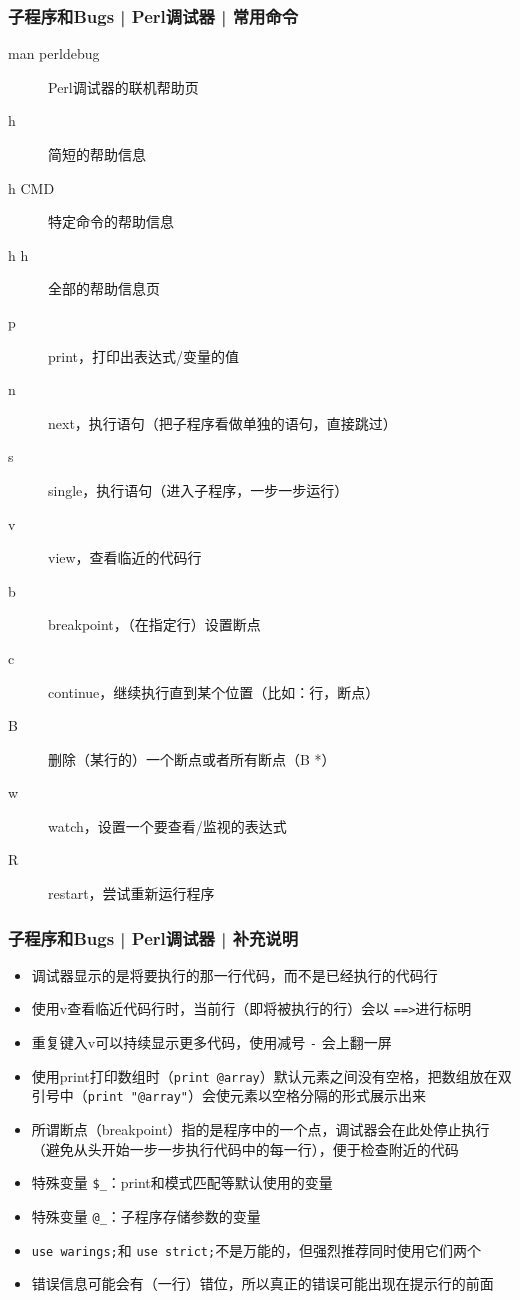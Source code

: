 \begin{frame}
  \frametitle{子程序和Bugs | Perl调试器 | \alert{常用命令}}
  \begin{description}
    \item[man perldebug] Perl调试器的联机帮助页
    \item[h] 简短的帮助信息
    \item[h CMD] 特定命令的帮助信息
    \item[h h] 全部的帮助信息页
    \item[p] print，打印出表达式/变量的值
    \item[n] next，执行语句（把子程序看做单独的语句，直接跳过）
    \item[s] single，执行语句（进入子程序，一步一步运行）
    \item[v] view，查看临近的代码行
    \item[b] breakpoint，（在指定行）设置断点
    \item[c] continue，继续执行直到某个位置（比如：行，断点）
    \item[B] 删除（某行的）一个断点或者所有断点（B *）
    \item[w] watch，设置一个要查看/监视的表达式
    \item[R] restart，尝试重新运行程序
  \end{description}
\end{frame}

\begin{frame}[fragile]
  \frametitle{子程序和Bugs | Perl调试器 | \alert{补充说明}}
  \begin{itemize}
    \item 调试器显示的是将要执行的那一行代码，而不是已经执行的代码行
    \item 使用v查看临近代码行时，当前行（即将被执行的行）会以 \verb|==>|进行标明
    \item 重复键入v可以持续显示更多代码，使用减号 \verb|-| 会上翻一屏
    \item 使用print打印数组时（\verb|print @array|）默认元素之间没有空格，把数组放在双引号中（\verb|print "@array"|）会使元素以空格分隔的形式展示出来
    \item 所谓断点（breakpoint）指的是程序中的一个点，调试器会在此处停止执行（避免从头开始一步一步执行代码中的每一行），便于检查附近的代码
    \item 特殊变量 \verb|$_|：print和模式匹配等默认使用的变量
    \item 特殊变量 \verb|@_|：子程序存储参数的变量
    \item \verb|use warings;|和 \verb|use strict;|不是万能的，但强烈推荐同时使用它们两个
    \item 错误信息可能会有（一行）错位，所以真正的错误可能出现在提示行的前面
  \end{itemize}
\end{frame}


